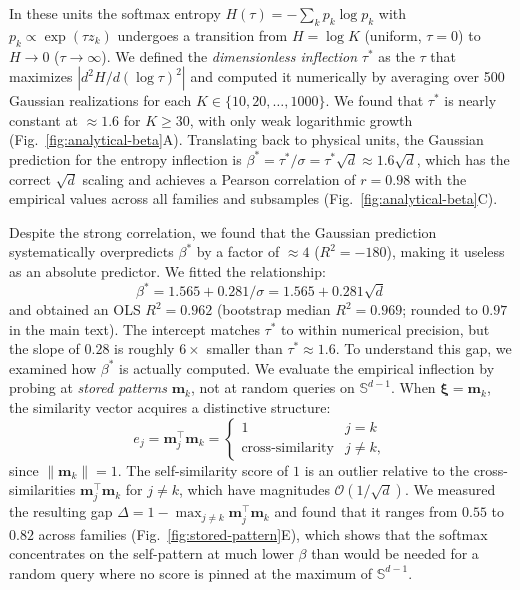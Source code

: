 \label{app:tau-star}
In these units the softmax entropy $H(\tau) = -\sum_k p_k \log p_k$ with $p_k \propto \exp(\tau z_k)$ undergoes a transition from $H = \log K$ (uniform, $\tau = 0$) to $H \to 0$ ($\tau \to \infty$). We defined the \emph{dimensionless inflection} $\tau^*$ as the $\tau$ that maximizes $|d^2H/d(\log\tau)^2|$ and computed it numerically by averaging over 500 Gaussian realizations for each $K \in \{10, 20, \ldots, 1000\}$. We found that $\tau^*$ is nearly constant at $\approx 1.6$ for $K \geq 30$, with only weak logarithmic growth (Fig.~\ref{fig:analytical-beta}A). Translating back to physical units, the Gaussian prediction for the entropy inflection is $\beta^* = \tau^*/\sigma = \tau^*\sqrt{d} \approx 1.6\sqrt{d}$, which has the correct $\sqrt{d}$ scaling and achieves a Pearson correlation of $r = 0.98$ with the empirical values across all families and subsamples (Fig.~\ref{fig:analytical-beta}C).

Despite the strong correlation, we found that the Gaussian prediction systematically overpredicts $\beta^*$ by a factor of $\approx 4$ ($R^2 = -180$), making it useless as an absolute predictor. We fitted the relationship:
\begin{equation}
    \beta^* = 1.565 + 0.281/\sigma = 1.565 + 0.281\sqrt{d}
\end{equation}
and obtained an OLS $R^2 = 0.962$ (bootstrap median $R^2 = 0.969$; rounded to $0.97$ in the main text). The intercept matches $\tau^*$ to within numerical precision, but the slope of $0.28$ is roughly $6\times$ smaller than $\tau^* \approx 1.6$. To understand this gap, we examined how $\beta^*$ is actually computed. We evaluate the empirical inflection by probing at \emph{stored patterns} $\mathbf{m}_k$, not at random queries on $\mathbb{S}^{d-1}$. When $\boldsymbol{\xi} = \mathbf{m}_k$, the similarity vector acquires a distinctive structure:
\begin{equation}
    e_j = \mathbf{m}_j^\top\mathbf{m}_k = \begin{cases} 1 & j = k \\ \text{cross-similarity} & j \neq k, \end{cases}
\end{equation}
since $\|\mathbf{m}_k\| = 1$. The self-similarity score of $1$ is an outlier relative to the cross-similarities $\mathbf{m}_j^\top\mathbf{m}_k$ for $j \neq k$, which have magnitudes $\mathcal{O}(1/\sqrt{d})$. We measured the resulting gap $\Delta = 1 - \max_{j\neq k}\mathbf{m}_j^\top\mathbf{m}_k$ and found that it ranges from $0.55$ to $0.82$ across families (Fig.~\ref{fig:stored-pattern}E), which shows that the softmax concentrates on the self-pattern at much lower $\beta$ than would be needed for a random query where no score is pinned at the maximum of $\mathbb{S}^{d-1}$.

